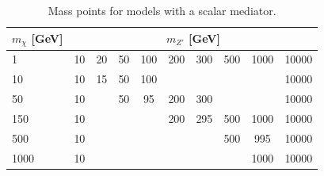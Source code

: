 \begin{table}[htbH] 
\begin{center} 
\begin{tabular}{ l | c | c | c | c | c | c | c | c | c} 
\hline 
$m_\chi$ [GeV] & \multicolumn{9}{c}{$m_{Z'}$ [GeV]} \\ 
\hline 
1 & 10 & 20 & 50 & 100 & 200 & 300 & 500 & 1000 & 10000 \\
10 & 10 & 15 & 50 & 100 & & & & & 10000 \\
50 & 10 & & 50 & 95  & 200 & 300 & & & 10000 \\
150 & 10 & & & & 200 & 295 & 500 & 1000 & 10000 \\
500 & 10 & & & & & & 500 & 995 & 10000 \\
1000 & 10 & & & & & & & 1000 & 10000 \\
\hline
\end{tabular} 
\caption{Mass points for models with a scalar mediator.}\label{tab:MMScalar} 
\end{center} 
\end{table} 

